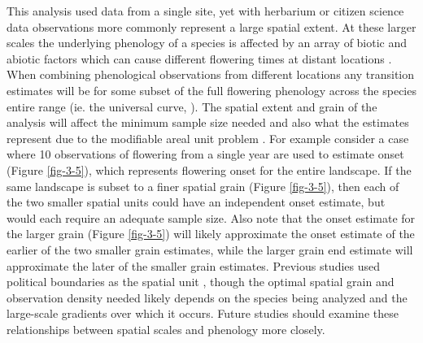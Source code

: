 This analysis used data from a single site, yet with herbarium or citizen science data observations more commonly represent a large spatial extent. At these larger scales the underlying phenology of a species is affected by an array of biotic and abiotic factors which can cause different flowering times at distant locations \citep{diez2012, dekeyzer2017, prevey2017}. When combining phenological observations from different locations any transition estimates will be for some subset of the full flowering phenology across the species entire range (ie. the universal curve, \cite{dekeyzer2017}). The spatial extent and grain of the analysis will affect the minimum sample size needed and also what the estimates represent due to the modifiable areal unit problem \citep{jelinski1996}. For example consider a case where 10 observations of flowering from a single year are used to estimate onset  (Figure \ref{fig-3-5}), which represents flowering onset for the entire landscape. If the same landscape is subset to a finer spatial grain (Figure \ref{fig-3-5}), then each of the two smaller spatial units could have an independent onset estimate, but would each require an adequate sample size. Also note that the onset estimate for the larger grain (Figure \ref{fig-3-5}) will likely approximate the onset estimate of the earlier of the two smaller grain estimates, while the larger grain end estimate will approximate the later of the smaller grain estimates. Previous studies used political boundaries as the spatial unit \citep{park2014, pearse2017}, though the optimal spatial grain and observation density needed likely depends on the species being analyzed and the large-scale gradients over which it occurs. Future studies should examine these relationships between spatial scales and phenology more closely.

\newpage


